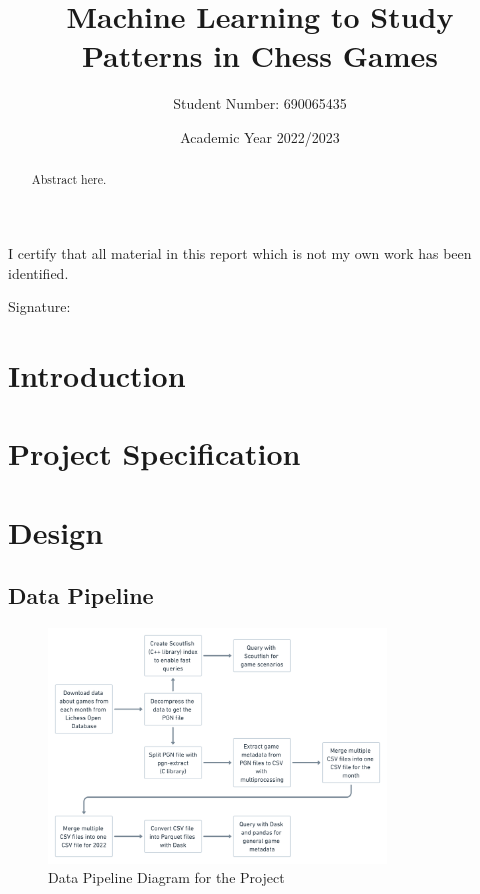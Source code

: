 \documentclass[a4paper, 11pt]{article}
\begin{document}
\title{Machine Learning to Study Patterns in Chess Games}
\author{Student Number: 690065435}
\date{Academic Year 2022/2023}

\maketitle

\begin{abstract}
{Abstract here}.

\begin{center}
\end{center}
\end{abstract}

\vspace*{\fill}
\begin{center}

\vspace{1em}
I certify that all material in this report which is not my own work has been identified.
\end{center}
\vspace{1em}

Signature: \hrulefill

\newpage

\section{Introduction}

\section{Project Specification}

\section{Design}

\subsection{Data Pipeline}

\begin{figure}[h]
    \centering
    \caption{Data Pipeline Diagram for the Project}
    \includegraphics[width=0.8\textwidth]{Data Pipeline.png}
\end{figure}
\end{document}
